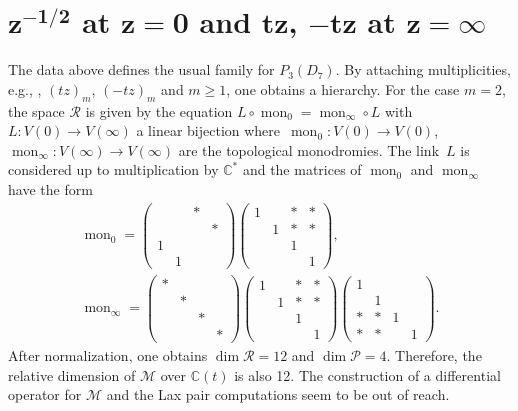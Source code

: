 \documentclass[10pt,a4paper]{amsart}
\numberwithin{equation}{section}
\begin{document}
\section[1/sqrt(z) at z=0 and tz, -tz at z=infty]{$\boldsymbol{z^{-1/2}}$ at $\boldsymbol{z=0}$ and $\boldsymbol{tz}$, $\boldsymbol{-tz}$ at $\boldsymbol{z=\infty }$}\label{sec12}
The data above defines the usual family for $P_3(D_7)$. By attaching multiplicities, e.g., , $(tz)_m$, $(-tz)_m$ and $m\geq 1$,
one obtains a hierarchy. For the case $m=2$, the space $\mathcal{R}$ is given by the equation
$L\circ \operatorname{mon}_0=\operatorname{mon}_{\infty}\circ L$ with $ L\colon V(0)\rightarrow V(\infty)$ a linear bijection
where~${\operatorname{mon}_0\colon V(0)\rightarrow V(0)}$, $ \operatorname{mon}_{\infty}\colon V(\infty )\rightarrow V(\infty) $ are
the topological monodromies. The link~$L$ is considered up to multiplication by $\mathbb{C}^*$
and the matrices of $\operatorname{mon}_0$ and $\operatorname{mon}_{\infty}$ have the form
\begin{gather*}
\operatorname{mon}_0= \begin{pmatrix} & & * & \\ & & &* \\ 1& & & \\ & 1& & \end{pmatrix}
\begin{pmatrix} 1& & * & *\\ & 1& *& *\\ & & 1& \\ & & &1 \end{pmatrix}, \\
\operatorname{mon}_{\infty}=\begin{pmatrix} *& & & \\ & *& & \\ & & *& \\ & & & *\end{pmatrix}
\begin{pmatrix} 1& &* &* \\ & 1& * & *\\ & & 1& \\ & & &1 \end{pmatrix}
\begin{pmatrix} 1& & & \\ & 1& & \\ *&* & 1& \\ *& *& &1 \end{pmatrix}.\end{gather*}
After normalization, one obtains $\dim \mathcal{R}=12$ and $\dim \mathcal{P}=4$. Therefore, the relative dimension
of $\mathcal{M}$ over $\mathbb{C}(t)$ is also 12. The construction of a differential operator for
 $\mathcal{M}$ and the Lax pair computations
seem to be out of reach.
\end{document}
